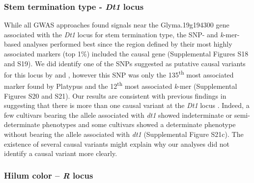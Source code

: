 \documentclass{article}
\begin{document}
\subsubsection*{Stem termination type - \textit{Dt1} locus}

While all GWAS approaches found signals near the Glyma.19g194300 gene
associated with the \textit{Dt1} locus for stem termination type, the SNP- and
\textit{k}-mer-based analyses performed best since the region defined by their
most highly associated markers (top 1\%) included the causal gene (Supplemental Figures
S18 and S19).
We did identify one of the SNPs suggested as putative causal variants for this
locus by  and , however this SNP was only the
135\textsuperscript{th} most associated marker found by Platypus and the
12\textsuperscript{th} most associated \emph{k}-mer (Supplemental Figures
S20 and S21).
Our results are consistent with previous findings in suggesting that there is
more than one causal variant at the \textit{Dt1} locus . Indeed, a few cultivars bearing the allele associated with
\emph{dt1} showed indeterminate or semi-determinate phenotypes and some
cultivars showed a determinate phenotype without bearing the allele associated
with \emph{dt1} (Supplemental Figure S21c). The existence of
several causal variants might explain why our analyses did not identify a
causal variant more clearly.

\subsubsection*{Hilum color -- \textit{R} locus}
\end{document}
